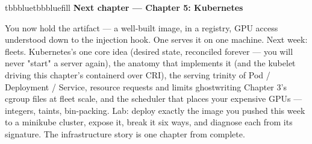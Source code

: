 \begin{calloutbox}{tbbblue}{tbbbluefill}
{\normalsize\bfseries\color{tbbblue}Next chapter — Chapter 5: Kubernetes}\par\vspace{3pt}
You now hold the artifact — a well-built image, in a registry, GPU access understood down to the injection hook. One  serves it on one machine. Next week: fleets. Kubernetes's one core idea (desired state, reconciled forever — you will never "start" a server again), the anatomy that implements it (and the kubelet driving this chapter's containerd over CRI), the serving trinity of Pod / Deployment / Service, resource requests and limits ghostwriting Chapter 3's cgroup files at fleet scale, and the scheduler that places your expensive GPUs — integers, taints, bin-packing. Lab: deploy exactly the image you pushed this week to a minikube cluster, expose it, break it six ways, and diagnose each from its signature. The infrastructure story is one chapter from complete.
\end{calloutbox}
